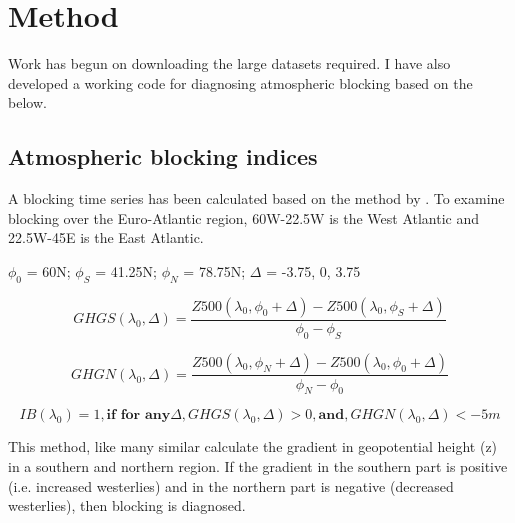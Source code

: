 \section{Method}
Work has begun on downloading the large datasets required. I have also developed a working code for diagnosing atmospheric blocking based on the below.


\subsection{Atmospheric blocking indices}

A blocking time series has been calculated based on the method by \cite{davini2016northern}. To examine blocking over the Euro-Atlantic region, 60W-22.5W is the West Atlantic and 22.5W-45E is the East Atlantic.

$\phi_{0}$ = 60N; $\phi_{S}$ = 41.25N; $\phi_{N}$ = 78.75N; $\Delta$ = -3.75, 0, 3.75

\begin{equation} \label{eqblock1} %
GHGS(\lambda_{0}, \Delta) = \frac{Z500(\lambda_{0}, \phi_{0}+ \Delta) - Z500(\lambda_{0}, \phi_{S}+ \Delta)}
{\phi_{0} - \phi_{S}}
\end{equation}

\begin{equation} \label{eqblock2}
GHGN(\lambda_{0}, \Delta) = \frac{Z500(\lambda_{0}, \phi_{N}+ \Delta) - Z500(\lambda_{0}, \phi_{0}+ \Delta)}
{\phi_{N} - \phi_{0}}
\end{equation}


\begin{equation} \label{eqblock3}
IB(\lambda_{0}) = 1,   \textbf{if for any} \Delta ,  GHGS(\lambda_{0}, \Delta) > 0  , \textbf{and},   GHGN(\lambda_{0}, \Delta) < -5 m 
\end{equation}


This method, like many similar calculate the gradient in geopotential height (z) in a southern and northern region. If the gradient in the southern part is positive (i.e. increased westerlies) and in the northern part is negative (decreased westerlies), then blocking is diagnosed.




